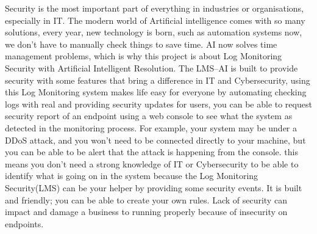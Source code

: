 
Security is the most important part of everything in industries or organisations, especially in IT. The modern world of Artificial intelligence comes with so many solutions, every year, new technology is born, such as automation systems now, we don’t have to manually check things to save time. AI now solves time management problems, which is why this project is about Log Monitoring Security with Artificial Intelligent Resolution. The LMS–AI is built to provide security with some features that bring a difference in IT and Cybersecurity, using this Log Monitoring system makes life easy for everyone by automating checking logs with real and providing security updates for users, you can be able to request security report of an endpoint using a web console to see what the system as detected in the monitoring process. For example, your system may be under a DDoS attack, and you won't need to be connected directly to your machine, but you can be able to be alert that the attack is happening from the console. this means you don't need a strong knowledge of IT or Cybersecurity to be able to identify what is going on in the system because the Log Monitoring Security(LMS) can be your helper by providing some security events. It is built and friendly; you can be able to create your own rules. Lack of security can impact and damage a business to running properly because of insecurity on endpoints.





  
